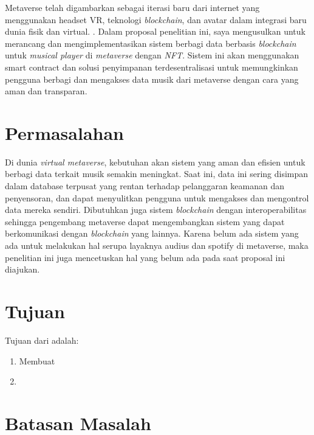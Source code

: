 Metaverse telah digambarkan sebagai iterasi baru dari internet yang menggunakan headset VR, teknologi \emph{blockchain},
dan avatar dalam integrasi baru dunia fisik dan virtual. \parencite{DWIVEDI2022102542}. Dalam proposal penelitian ini, saya mengusulkan
untuk merancang dan mengimplementasikan sistem berbagi data berbasis \emph{blockchain}
untuk \emph{musical player} di \emph{metaverse} dengan \emph{NFT}. Sistem ini akan menggunakan smart contract dan solusi penyimpanan terdesentralisasi
untuk memungkinkan pengguna berbagi dan mengakses data musik dari metaverse dengan cara yang aman dan transparan.

\lipsum[2]

\section{Permasalahan}
\label{sec:permasalahan}

Di dunia \emph{virtual metaverse}, kebutuhan akan sistem yang aman dan efisien untuk berbagi data terkait musik semakin meningkat.
Saat ini, data ini sering disimpan dalam database terpusat yang rentan terhadap pelanggaran keamanan dan
penyensoran, dan dapat menyulitkan pengguna untuk mengakses dan mengontrol data mereka sendiri. Dibutuhkan juga sistem \emph{blockchain} dengan interoperabilitas sehingga
pengembang metaverse dapat mengembangkan sistem yang dapat berkomunikasi dengan \emph{blockchain} yang lainnya. Karena belum ada sistem yang ada untuk melakukan hal serupa layaknya audius dan spotify di metaverse,
maka penelitian ini juga mencetuskan hal yang belum ada pada saat proposal ini diajukan.

\section{Tujuan}
\label{sec:Tujuan}

Tujuan dari \lipsum[1][1-3] adalah:

\begin{enumerate}[nolistsep]

  \item Membuat \lipsum[2][1-3]

  \item \lipsum[3][1-3]

\end{enumerate}

\section{Batasan Masalah}
\label{sec:batasanmasalah}

